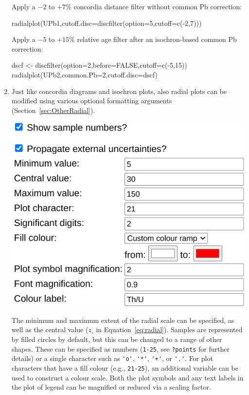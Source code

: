 \begin{refsection}
\begin{enumerate}
\noindent Apply a $-2$ to $+7$\% concordia distance filter without common
  Pb correction:
\begin{console}
radialplot(UPb1,cutoff.disc=discfilter(option=5,cutoff=c(-2,7)))
\end{console}

\noindent Apply a $-5$ to $+15$\% relative age filter after an
isochron-based common Pb correction:
\begin{script}
dscf <- discfilter(option=2,before=FALSE,cutoff=c(-5,15))
radialplot(UPb2,common.Pb=2,cutoff.disc=dscf)
\end{script}

\item Just like concordia diagrams and isochron plots, also radial
  plots can be modified using various optional formatting arguments
  (Section~\ref{sec:OtherRadial}).

\noindent\begin{minipage}[t]{.45\linewidth}
\strut\vspace*{-\baselineskip}\newline
\includegraphics[width=\linewidth]{../figures/UPbRadialOtherOptions.png}
\end{minipage}
\begin{minipage}[t]{.55\linewidth}
  The minimum and maximum extent of the radial scale can be specified,
  as well as the central value ($z_\circ$ in
  Equation~\ref{eq:radial}). Samples are represented by filled circles
  by default, but this can be changed to a range of other
  shapes. These can be specified as numbers (\texttt{1-25}, see
  \texttt{?points} for further details) or a single character such as
  \verb|'o'|, \verb|'*'|, \verb|'+'|, or \verb|'.'|. For plot
  characters that have a fill colour (e.g., \texttt{21-25}), an
  additional variable can be used to construct a colour scale. Both
  the plot symbols and any text labels in the plot of legend can be
  magnified or reduced via a scaling factor.
\end{minipage}


\end{enumerate}
\end{refsection}
